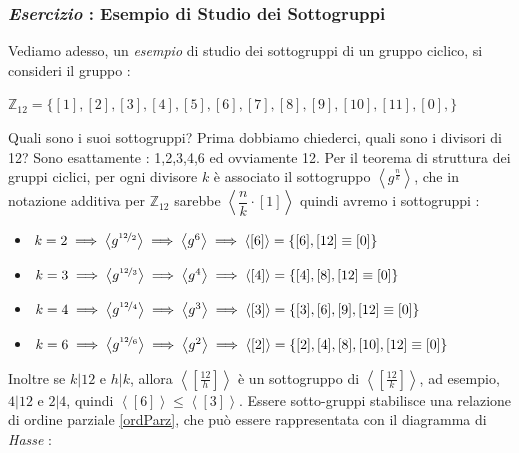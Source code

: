 \documentclass[12pt, letterpaper]{article}
\newcommand{\Z}{{\mathbb Z}}
\begin{document}
\subsubsection{\textit{Esercizio} : Esempio di Studio dei Sottogruppi}
Vediamo adesso, un \textit{esempio} di studio dei sottogruppi di un gruppo ciclico, si consideri il gruppo :\begin{center}
    \(\Z_{12}=\{[1],[2],[3],[4],[5],[6],[7],[8],[9],[10],[11],[0],\}\)
\end{center}
Quali sono i suoi sottogruppi? Prima dobbiamo chiederci, quali sono i divisori di 12? Sono 
esattamente : 1,2,3,4,6 ed ovviamente 12. Per il teorema di struttura dei gruppi ciclici, per ogni divisore 
\(k\) è associato il sottogruppo \(\left\langle g^{\frac{n}{k}}\right\rangle\), che in notazione additiva 
per \(\Z_{12}\) sarebbe \(\left\langle \dfrac{n}{k}\cdot [1]\right\rangle\) quindi avremo i sottogruppi : 
\begin{itemize}
    \item \(k=2\implies\left\langle g^{\nicefrac{12}{2}}\right\rangle\implies \left\langle g^{6}\right\rangle\implies \left\langle [6]\right\rangle=\{[6],[12]\equiv[0]\}\)
    \item \(k=3\implies\left\langle g^{\nicefrac{12}{3}}\right\rangle\implies \left\langle g^{4}\right\rangle\implies \left\langle [4]\right\rangle=\{[4],[8],[12]\equiv[0]\}\)
    \item \(k=4\implies\left\langle g^{\nicefrac{12}{4}}\right\rangle\implies \left\langle g^{3}\right\rangle\implies \left\langle [3]\right\rangle=\{[3],[6],[9],[12]\equiv[0]\}\)
    \item \(k=6\implies\left\langle g^{\nicefrac{12}{6}}\right\rangle\implies \left\langle g^{2}\right\rangle\implies \left\langle [2]\right\rangle=\{[2],[4],[8],[10],[12]\equiv[0]\}\)
\end{itemize}
Inoltre se \(k|12\) e \(h|k\), allora \(\left\langle [\frac{12}{h}]\right\rangle\) è un sottogruppo 
di \(\left\langle [\frac{12}{k}]\right\rangle\), ad esempio, \(4|12\) e \(2|4\), quindi 
\(\left\langle [6]\right\rangle\le\left\langle [3]\right\rangle\). Essere sotto-gruppi stabilisce una relazione 
di ordine parziale \ref{ordParz}, che può essere rappresentata con il diagramma di \textit{Hasse} : 
\begin{figure}[h]
\end{figure}
\end{document}
